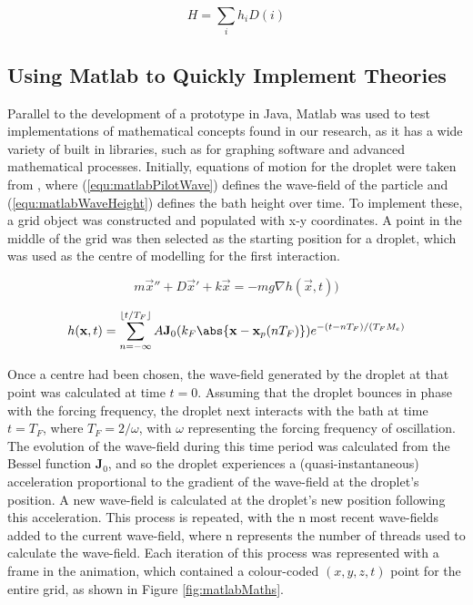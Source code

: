 $$H = \sum_i h_i D(i)$$

\subsection{Using Matlab to Quickly Implement Theories}
Parallel to the development of a prototype in Java, Matlab was used to test implementations of mathematical concepts found in our research, as it has a wide variety of built in libraries, such as for graphing software and advanced mathematical processes. Initially, equations of motion for the droplet were taken from \cite{oza2013trajectory}, where (\ref{equ:matlabPilotWave}) defines the wave-field of the particle and (\ref{equ:matlabWaveHeight}) defines the bath height over time. To implement these, a grid object was constructed and populated with x-y coordinates. A point in the middle of the grid was then selected as the starting position for a droplet, which was used as the centre of modelling for the first interaction.


\begin{equation}
m \vec{x}'' + D\vec{x}' + k\vec{x} = -mg\nabla h(\vec{x},t)
\label{equ:matlabPilotWave})
\end{equation}

\begin{equation}
h(\mathbf{x},t) = \sum_{n=-\infty}^{\floor{t/T_F}} A \mathbf{J}_0(k_F \abs{\mathbf{x}-\mathbf{x}_p(nT_F)}) e^{-(t-nT_F)/(T_F M_e)}
\label{equ:matlabWaveHeight}
\end{equation}

Once a centre had been chosen, the wave-field generated by the droplet at that point was calculated at time $t=0$. Assuming that the droplet bounces in phase with the forcing frequency, the droplet next interacts with the bath at time $t=T_F$, where $T_F = 2/\omega$, with $\omega$ representing the forcing frequency of oscillation. The evolution of the wave-field during this time period was calculated from the Bessel function $\mathbf{J}_0$, and so the droplet experiences a (quasi-instantaneous) acceleration proportional to the gradient of the wave-field at the droplet's position. A new wave-field is calculated at the droplet's new position following this acceleration. This process is repeated, with the n most recent wave-fields added to the current wave-field, where n represents the number of threads used to calculate the wave-field. Each iteration of this process was represented with a frame in the animation, which contained a colour-coded $(x,y,z,t)$ point for the entire grid, as shown in Figure \ref{fig:matlabMaths}.

